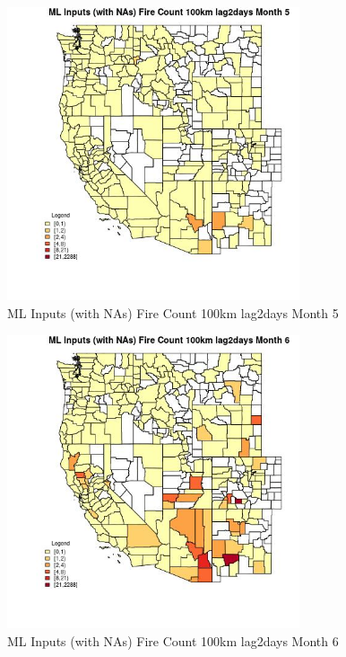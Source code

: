 \begin{figure} 
\centering  
\includegraphics[width=0.77\textwidth]{Code_Outputs/Report_ML_input_PM25_Step4_part_e_de_duplicated_aves_compiled_2019-05-21wNAs_CountyFire_Count_100km_lag2daysmedianMonth5.jpg} 
\caption{\label{fig:Report_ML_input_PM25_Step4_part_e_de_duplicated_aves_compiled_2019-05-21wNAsCountyFire_Count_100km_lag2daysmedianMonth5}ML Inputs (with NAs) Fire Count 100km lag2days Month 5} 
\end{figure} 
 

\begin{figure} 
\centering  
\includegraphics[width=0.77\textwidth]{Code_Outputs/Report_ML_input_PM25_Step4_part_e_de_duplicated_aves_compiled_2019-05-21wNAs_CountyFire_Count_100km_lag2daysmedianMonth6.jpg} 
\caption{\label{fig:Report_ML_input_PM25_Step4_part_e_de_duplicated_aves_compiled_2019-05-21wNAsCountyFire_Count_100km_lag2daysmedianMonth6}ML Inputs (with NAs) Fire Count 100km lag2days Month 6} 
\end{figure} 
 

